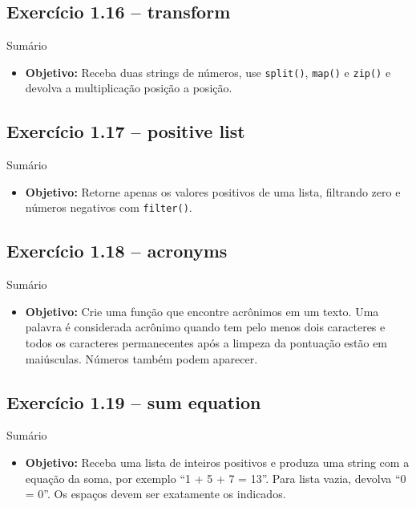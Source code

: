 \documentclass[11pt,a4paper]{article}
\begin{document}
\subsection*{Exercício 1.16 -- transform}
\begin{exercicio}{Sumário}
\begin{itemize}
    \item \textbf{Objetivo:} Receba duas strings de números, use \texttt{split()}, \texttt{map()} e \texttt{zip()} e devolva a multiplicação posição a posição.
\end{itemize}
\end{exercicio}

\subsection*{Exercício 1.17 -- positive list}
\begin{exercicio}{Sumário}
\begin{itemize}
    \item \textbf{Objetivo:} Retorne apenas os valores positivos de uma lista, filtrando zero e números negativos com \texttt{filter()}.
\end{itemize}
\end{exercicio}

\subsection*{Exercício 1.18 -- acronyms}
\begin{exercicio}{Sumário}
\begin{itemize}
    \item \textbf{Objetivo:} Crie uma função que encontre acrônimos em um texto. Uma palavra é considerada acrônimo quando tem pelo menos dois caracteres e todos os caracteres permanecentes após a limpeza da pontuação estão em maiúsculas. Números também podem aparecer.
\end{itemize}
\end{exercicio}

\subsection*{Exercício 1.19 -- sum equation}
\begin{exercicio}{Sumário}
\begin{itemize}
    \item \textbf{Objetivo:} Receba uma lista de inteiros positivos e produza uma string com a equação da soma, por exemplo ``1 + 5 + 7 = 13''. Para lista vazia, devolva ``0 = 0''. Os espaços devem ser exatamente os indicados.
\end{itemize}
\end{exercicio}
\end{document}
